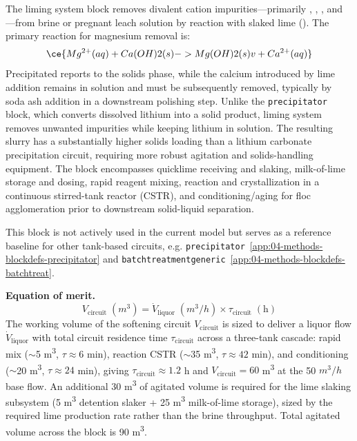 \documentclass{article}
\renewcommand\_{\textunderscore\allowbreak}
\begin{document}
The liming system block removes divalent cation impurities---primarily , , , and ---from brine or pregnant leach solution by reaction with slaked lime (). The primary reaction for magnesium removal is:
\begin{equation}
	\ce{Mg^{2+}(aq) + Ca(OH)2(s) -> Mg(OH)2(s) v + Ca^{2+}(aq)}
\end{equation}
Precipitated  reports to the solids phase, while the calcium introduced by lime addition remains in solution and must be subsequently removed, typically by soda ash addition in a downstream polishing step. Unlike the \texttt{precipitator} block, which converts dissolved lithium into a solid product, liming system removes unwanted impurities while keeping lithium in solution. The resulting slurry has a substantially higher solids loading than a lithium carbonate precipitation circuit, requiring more robust agitation and solids-handling equipment. The block encompasses quicklime receiving and slaking, milk-of-lime storage and dosing, rapid reagent mixing, reaction and crystallization in a continuous stirred-tank reactor (CSTR), and conditioning/aging for floc agglomeration prior to downstream solid-liquid separation.

This block is not actively used in the current model but serves as a reference baseline for other tank-based circuits, e.g. \texttt{precipitator}~\ref{app:04-methods-blockdefs-precipitator} and \texttt{batch\_treatment\_generic}~\ref{app:04-methods-blockdefs-batchtreat}.

\medskip
\noindent\textbf{Equation of merit.}\quad
\[
	V_\text{circuit}\;(\si{m^3}) = \dot{V}_\text{liquor}\;(\si{m^3/h}) \times \tau_\text{circuit}\;(\text{h})
\]
The working volume of the softening circuit $V_\text{circuit}$ is sized to deliver a liquor flow $\dot{V}_\text{liquor}$ with total circuit residence time $\tau_\text{circuit}$ across a three-tank cascade: rapid mix ($\sim$5 \si{m^3}, $\tau \approx 6$ min), reaction CSTR ($\sim$35 \si{m^3}, $\tau \approx 42$ min), and conditioning ($\sim$20 \si{m^3}, $\tau \approx 24$ min), giving $\tau_\text{circuit} \approx 1.2$ h and $V_\text{circuit} = 60$ \si{m^3} at the 50 $\si{m^3/h}$ base flow. An additional 30 \si{m^3} of agitated volume is required for the lime slaking subsystem (5 \si{m^3} detention slaker + 25 \si{m^3} milk-of-lime storage), sized by the required lime production rate rather than the brine throughput. Total agitated volume across the block is 90 \si{m^3}.
\end{document}
